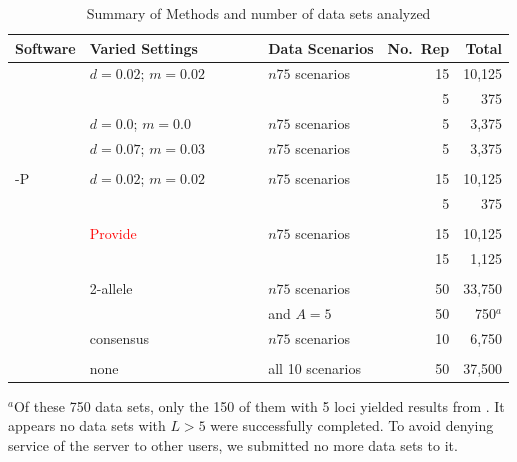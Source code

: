 \documentclass[11pt]{article}
\begin{document}
\begin{table}
\begin{center}
\caption{Summary of Methods and number of data sets analyzed \label{tab:methsum}}
\begin{tabular}{lllrr}
Software & Varied Settings~~~~~~~ & Data Scenarios & No.~Rep & Total \\ \hline
\colony{} & $d=0.02$; $m=0.02$ & $n75$ scenarios & 15 & 10,125 \\
          &                  & \lottalarge{}          & 5  &    375 \\      
          & $d=0.0$; $m=0.0$ & $n75$ scenarios & 5  &    3,375 \\ 
          & $d=0.07$; $m=0.03$ & $n75$ scenarios & 5  &    3,375 \\     
 \\
\colony{}-P & $d=0.02$; $m=0.02$ & $n75$ scenarios & 15 & 10,125 \\
            &                  & \lottalarge{}          & 5  &    375\\
 \\
\prt{}      &    \textcolor{red}{Provide}              & $n75$ scenarios & 15 & 10,125 \\
            &                  & \lottalarge{}          & 15  &    1,125\\
\\
\kinalyzer{}~~~ & 2-allele      &   $n75$ scenarios & 50 & 33,750 \\ 
             &               &   \lottalarge{} and $A=5$ & 50 & 750$^a$ \\ 
             & consensus      &   $n75$ scenarios  & 10 & 6,750 \\
\\
\familyfinder{}  &  none  &  all 10 scenarios  &  50  &  37,500 
\end{tabular}
\end{center}
{\footnotesize
$\mbox{}^a$Of these 750 data sets, only the 150 of them with 5 loci yielded results from \kinalyzer{}.  
It appears no data sets with $L>5$ were successfully completed. To avoid denying service of the 
\kinalyzer{} server to other users, we submitted no more \lottalarge{} data sets to it.   
}
\end{table}
\end{document}
